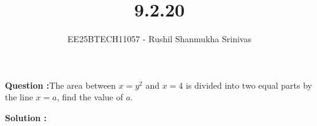 \documentclass[journal]{IEEEtran}
\begin{document}




\title{9.2.20}
\author{EE25BTECH11057 - Rushil Shanmukha Srinivas
}
{\let\newpage\relax\maketitle}

\renewcommand{\thefigure}{\theenumi}
\renewcommand{\thetable}{\theenumi}
\setlength{\intextsep}{10pt} %

\renewcommand{\thetable}{\theenumi}
\textbf{Question :}The area between $x = y^2$ and $x = 4$ is divided into two equal parts by the line $x = a$, find the value of $a$.

\textbf{Solution :}
\begin{table}[h!]
  \centering
  
  \caption*{Table : Conics}
  \label{9.2.20}
\end{table}
\end{document}
